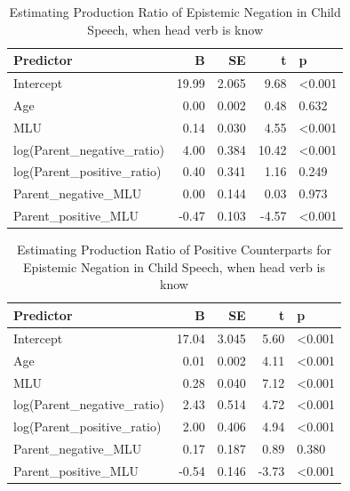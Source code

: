 \documentclass[
  english,
  man,floatsintext]{apa6}
\begin{document}
\clearpage

\begin{table}

\caption{\label{tab:unnamed-chunk-7}Estimating Production Ratio of Epistemic Negation in Child Speech, when head verb is know}
\centering
\begin{tabular}[t]{l|r|r|r|l}
\hline
Predictor & B & SE & t & p\\
\hline
Intercept & 19.99 & 2.065 & 9.68 & <0.001\\
\hline
Age & 0.00 & 0.002 & 0.48 & 0.632\\
\hline
MLU & 0.14 & 0.030 & 4.55 & <0.001\\
\hline
log(Parent\_negative\_ratio) & 4.00 & 0.384 & 10.42 & <0.001\\
\hline
log(Parent\_positive\_ratio) & 0.40 & 0.341 & 1.16 & 0.249\\
\hline
Parent\_negative\_MLU & 0.00 & 0.144 & 0.03 & 0.973\\
\hline
Parent\_positive\_MLU & -0.47 & 0.103 & -4.57 & <0.001\\
\hline
\end{tabular}
\end{table}

\begin{table}

\caption{\label{tab:unnamed-chunk-7}Estimating Production Ratio of Positive Counterparts for Epistemic Negation in Child Speech, when head verb is know}
\centering
\begin{tabular}[t]{l|r|r|r|l}
\hline
Predictor & B & SE & t & p\\
\hline
Intercept & 17.04 & 3.045 & 5.60 & <0.001\\
\hline
Age & 0.01 & 0.002 & 4.11 & <0.001\\
\hline
MLU & 0.28 & 0.040 & 7.12 & <0.001\\
\hline
log(Parent\_negative\_ratio) & 2.43 & 0.514 & 4.72 & <0.001\\
\hline
log(Parent\_positive\_ratio) & 2.00 & 0.406 & 4.94 & <0.001\\
\hline
Parent\_negative\_MLU & 0.17 & 0.187 & 0.89 & 0.380\\
\hline
Parent\_positive\_MLU & -0.54 & 0.146 & -3.73 & <0.001\\
\hline
\end{tabular}
\end{table}

\clearpage
\end{document}
